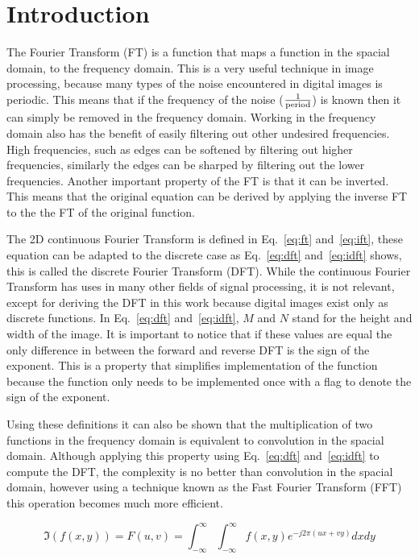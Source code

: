 \section{Introduction}
  The Fourier Transform (FT) is a function that maps a function in the spacial domain, to the frequency domain.
This is a very useful technique in image processing, because many types of the noise encountered in digital images
is periodic.  This means that if the frequency of the noise ($\frac{1}{\textup{period}}$) is known then it can
simply be removed in the frequency domain.  Working in the frequency domain also has the benefit of easily filtering
out other undesired frequencies.  High frequencies, such as edges can be softened by filtering out higher frequencies,
similarly the edges can be sharped by filtering out the lower frequencies.  Another important property of the
FT is that it can be inverted.  This means that the original equation can be derived by applying the inverse
FT to the the FT of the original function.

  The 2D continuous Fourier Transform is defined in Eq.~\ref{eq:ft} and~\ref{eq:ift}, these equation can be adapted to the
discrete case as Eq.~\ref{eq:dft} and~\ref{eq:idft} shows, this is called the discrete Fourier Transform (DFT).  While the
continuous Fourier Transform has uses in many other fields of
signal processing, it is not relevant, except for deriving the DFT in this work because digital images exist only
as discrete functions.  In Eq.~\ref{eq:dft} and~\ref{eq:idft}, $M$ and $N$ stand for the height and width
of the image.  It is important to notice that if these values are equal the only difference in between the forward and
reverse DFT is the sign of the exponent.  This is a property that simplifies implementation of the function because
the function only needs to be implemented once with a flag to denote the sign of the exponent.

  Using these definitions it can also be shown that the multiplication of two functions in the frequency domain is
equivalent to convolution in the spacial domain.  Although applying this property using Eq.~\ref{eq:dft} and~\ref{eq:idft}
to compute the DFT, the complexity is no better than convolution in the spacial domain, however using a technique known as
the Fast Fourier Transform (FFT) this operation becomes much more efficient.

\begin{equation}
  \label{eq:ft}
  \Im(f(x,y))=F(u,v)=\int_{-\infty}^{\infty} \int_{-\infty}^{\infty} f(x,y)e^{-j2\pi(ux+vy)} dx dy
\end{equation}

